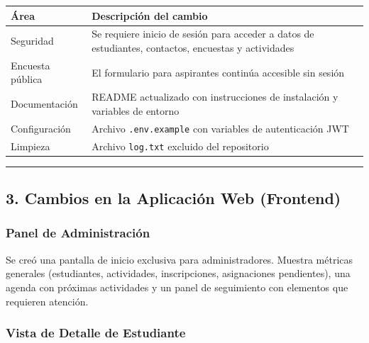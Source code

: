 \documentclass[
]{article}
\newcounter{none} %
\begin{document}
{\def\LTcaptype{none} %
\begin{longtable}[]{@{}
  >{\raggedright\arraybackslash}p{}
  >{\raggedright\arraybackslash}p{}@{}}
\toprule\noalign{}
\begin{minipage}[b]{\linewidth}\raggedright
Área
\end{minipage} & \begin{minipage}[b]{\linewidth}\raggedright
Descripción del cambio
\end{minipage} \\
\midrule\noalign{}
\endhead
\bottomrule\noalign{}
\endlastfoot
Seguridad & Se requiere inicio de sesión para acceder a datos de
estudiantes, contactos, encuestas y actividades \\
Encuesta pública & El formulario para aspirantes continúa accesible sin
sesión \\
Documentación & README actualizado con instrucciones de instalación y
variables de entorno \\
Configuración & Archivo \texttt{.env.example} con variables de
autenticación JWT \\
Limpieza & Archivo \texttt{log.txt} excluido del repositorio \\
\end{longtable}
}

\begin{center}\rule{0.5\linewidth}{0.5pt}\end{center}

\subsection{3. Cambios en la Aplicación Web
(Frontend)}\label{cambios-en-la-aplicaciuxf3n-web-frontend}

\subsubsection{Panel de
Administración}\label{panel-de-administraciuxf3n}

Se creó una pantalla de inicio exclusiva para administradores. Muestra
métricas generales (estudiantes, actividades, inscripciones,
asignaciones pendientes), una agenda con próximas actividades y un panel
de seguimiento con elementos que requieren atención.

\subsubsection{Vista de Detalle de
Estudiante}\label{vista-de-detalle-de-estudiante}
\end{document}
